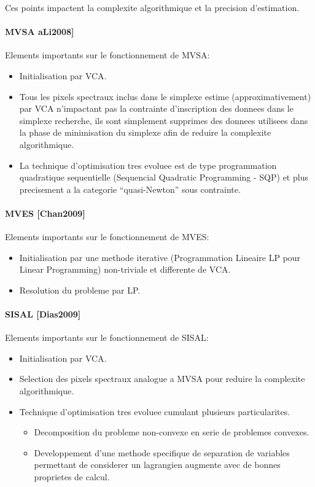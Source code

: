  
Ces points impactent la complexite algorithmique et la precision
d'estimation. 
 
\paragraph{MVSA aLi2008]} 
Elements importants sur le fonctionnement de MVSA: 
\begin{itemize}
\item {Initialisation par VCA.}
\item {Tous les pixels spectraux inclus dans le simplexe estime
  (approximativement) par VCA n'impactant pas la contrainte
  d'inscription des donnees dans le simplexe recherche, ils sont
  simplement supprimes des donnees utilisees dans la phase de
  minimisation du simplexe afin de reduire la complexite
  algorithmique.}
\item {La technique d'optimisation tres evoluee est de type
  programmation quadratique sequentielle (Sequencial Quadratic
  Programming - SQP) et plus precisement a la categorie
  ``quasi-Newton'' sous contrainte.}
\end{itemize} 

\paragraph{MVES [Chan2009]}
 Elements importants sur le fonctionnement de MVES: 
\begin{itemize}
\item {Initialisation par une
  methode iterative (Programmation Lineaire LP pour Linear
  Programming) non-triviale et differente de VCA.}
\item {Resolution du
  probleme par LP.}
\end{itemize} 
 

\paragraph{SISAL [Dias2009]}
Elements importants sur le fonctionnement de SISAL: 
\begin{itemize}
\item {Initialisation
par VCA.}
\item {Selection des pixels spectraux analogue a MVSA pour reduire
la complexite algorithmique.}
\item {Technique d'optimisation tres evoluee
cumulant plusieurs particularites.}
\begin{itemize}
\item {Decomposition du probleme
non-convexe en serie de problemes convexes.}
\item {Developpement d'une
methode specifique de separation de variables permettant de considerer
un lagrangien augmente avec de bonnes proprietes de calcul.}
\end{itemize}
\end{itemize} 

